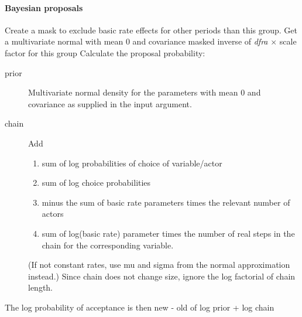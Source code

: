 \documentclass[12pt,a4paper]{article}
\renewcommand{\=}{\,=\,}
\newcommand{\+}{\,+\,}
\newcommand{\nnm}[1]{\textsf{\small\textit{#1}}}
\begin{document}
\paragraph{Bayesian proposals}
\label{sec:prop}
\begin{algorithmic}
\STATE Create a mask to exclude basic rate effects for other periods than this
group.
\STATE Get a multivariate normal with mean 0 and covariance masked inverse of
\nnm{dfra} $\times$ scale factor for this group
\STATE Calculate the proposal probability:
\begin{description}
\item[prior] Multivariate normal density for the parameters with mean 0
  and covariance as supplied in the input argument.
\item[chain] Add
\begin{enumerate}
\item sum of log probabilities of choice of variable/actor
\item sum of log choice probabilities
\item minus the sum of basic rate parameters times the
relevant number of actors
\item sum of log(basic rate) parameter times the
number of real steps in the chain for the corresponding variable.
\end{enumerate}
(If not constant rates, use mu and sigma from the normal approximation instead.)
Since chain does not change size, ignore the log factorial of chain length.
\end{description}
\STATE The log probability of acceptance is then new - old  of log prior +
log chain
\ENDFOR
\end{algorithmic}
\end{document}
